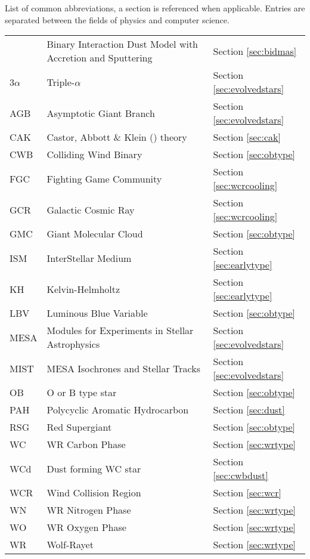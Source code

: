 \begin{abbreviations}
List of common abbreviations, a section is referenced when applicable. Entries are separated between the fields of physics and computer science.

\begin{table}[h]
  \centering
  \begin{tabular}{lll}
    
    \hline

    \bidmas{} & Binary Interaction Dust Model with Accretion and Sputtering & Section \ref{sec:bidmas} \\
    3$\alpha$ & Triple-$\alpha$ & Section \ref{sec:evolvedstars} \\
    AGB & Asymptotic Giant Branch & Section \ref{sec:evolvedstars} \\
    CAK & Castor, Abbott \& Klein (\citeyear{castor_radiation-driven_1975}) theory & Section \ref{sec:cak} \\
    CWB & Colliding Wind Binary  & Section \ref{sec:obtype} \\
    FGC & Fighting Game Community & Section \ref{sec:wcrcooling} \\
    GCR & Galactic Cosmic Ray & Section \ref{sec:wcrcooling} \\
    GMC & Giant Molecular Cloud & Section \ref{sec:obtype}\\
    ISM & InterStellar Medium & Section \ref{sec:earlytype} \\
    KH  & Kelvin-Helmholtz & Section \ref{sec:earlytype} \\ 
    LBV & Luminous Blue Variable & Section \ref{sec:obtype} \\
    MESA & Modules for Experiments in Stellar Astrophysics & Section \ref{sec:evolvedstars} \\
    MIST & MESA Isochrones and Stellar Tracks & Section \ref{sec:evolvedstars} \\
    OB  & O or B type star & Section \ref{sec:obtype} \\ 
    PAH & Polycyclic Aromatic Hydrocarbon & Section \ref{sec:dust} \\
    RSG & Red Supergiant & Section \ref{sec:obtype} \\
    WC  & WR Carbon Phase & Section \ref{sec:wrtype} \\
    WCd & Dust forming WC star & Section \ref{sec:cwbdust} \\
    WCR & Wind Collision Region & Section \ref{sec:wcr} \\
    WN  & WR Nitrogen Phase & Section \ref{sec:wrtype} \\
    WO  & WR Oxygen Phase & Section \ref{sec:wrtype} \\
    WR  & Wolf-Rayet & Section \ref{sec:wrtype} \\


\end{tabular}
\end{table}
\end{abbreviations}
